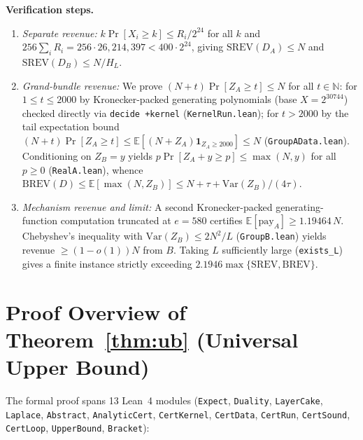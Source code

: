\documentclass[11pt]{article}
\newcommand{\SREV}{\mathrm{SREV}}
\newcommand{\BREV}{\mathrm{BREV}}
\newcommand{\E}{\mathbb{E}}
\begin{document}
\noindent\textbf{Verification steps.}\nopagebreak[4]
\begin{enumerate}
  \item \emph{Separate revenue:} $k \Pr[X_i \ge k] \le R_i / 2^{24}$ for all $k$ and $256 \sum_i R_i = 256 \cdot 26{,}214{,}397 < 400 \cdot 2^{24}$, giving $\SREV(D_A) \le N$ and $\SREV(D_B) \le N/H_L$.
  \item \emph{Grand-bundle revenue:} We prove $(N+t)\Pr[Z_A \ge t] \le N$ for all $t \in \mathbb{N}$: for $1 \le t \le 2000$ by Kronecker-packed generating polynomials (base $X = 2^{30744}$) checked directly via \texttt{decide +kernel} (\texttt{KernelRun.lean}); for $t > 2000$ by the tail expectation bound $(N+t)\Pr[Z_A \ge t] \le \E[(N+Z_A)\mathbf{1}_{Z_A \ge 2000}] \le N$ (\texttt{GroupAData.lean}). Conditioning on $Z_B = y$ yields $p\Pr[Z_A + y \ge p] \le \max(N, y)$ for all $p \ge 0$ (\texttt{RealA.lean}), whence $\BREV(D) \le \E[\max(N, Z_B)] \le N + \tau + \mathrm{Var}(Z_B)/(4\tau)$.
  \item \emph{Mechanism revenue and limit:} A second Kronecker-packed generating-function computation truncated at $e = 580$ certifies $\E[\text{pay}_A] \ge 1.19464\,N$. Chebyshev's inequality with $\mathrm{Var}(Z_B) \le 2N^2/L$ (\texttt{GroupB.lean}) yields revenue $\ge (1 - o(1))N$ from $B$. Taking $L$ sufficiently large (\texttt{exists\_L}) gives a finite instance strictly exceeding $2.1946 \max\{\SREV, \BREV\}$.
\end{enumerate}

\section{Proof Overview of Theorem~\ref{thm:ub} (Universal Upper Bound)}

The formal proof spans 13 Lean~4 modules (\texttt{Expect}, \texttt{Duality}, \texttt{LayerCake}, \texttt{Laplace}, \texttt{Abstract}, \texttt{AnalyticCert}, \texttt{CertKernel}, \texttt{CertData}, \texttt{CertRun}, \texttt{CertSound}, \texttt{CertLoop}, \texttt{UpperBound}, \texttt{Bracket}):
\end{document}
